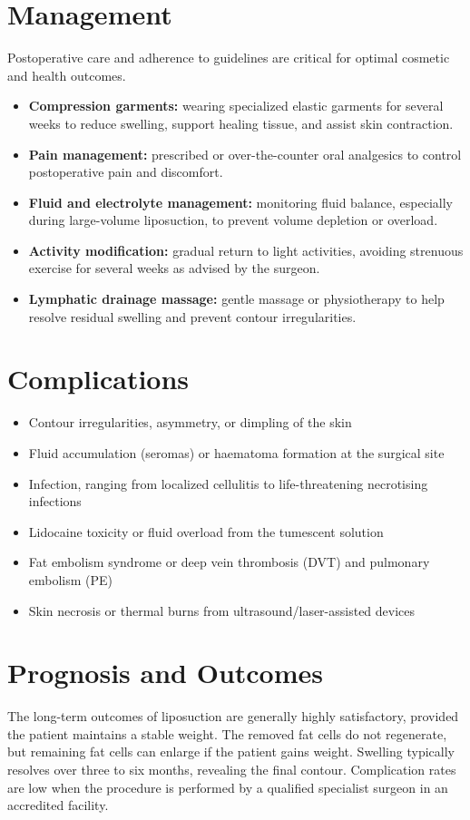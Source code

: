 \section*{Management}
Postoperative care and adherence to guidelines are critical for optimal cosmetic and health outcomes.
\begin{itemize}
    \item \textbf{Compression garments:} wearing specialized elastic garments for several weeks to reduce swelling, support healing tissue, and assist skin contraction.
    \item \textbf{Pain management:} prescribed or over-the-counter oral analgesics to control postoperative pain and discomfort.
    \item \textbf{Fluid and electrolyte management:} monitoring fluid balance, especially during large-volume liposuction, to prevent volume depletion or overload.
    \item \textbf{Activity modification:} gradual return to light activities, avoiding strenuous exercise for several weeks as advised by the surgeon.
    \item \textbf{Lymphatic drainage massage:} gentle massage or physiotherapy to help resolve residual swelling and prevent contour irregularities.
\end{itemize}

\section*{Complications}
\begin{itemize}
    \item Contour irregularities, asymmetry, or dimpling of the skin
    \item Fluid accumulation (seromas) or haematoma formation at the surgical site
    \item Infection, ranging from localized cellulitis to life-threatening necrotising infections
    \item Lidocaine toxicity or fluid overload from the tumescent solution
    \item Fat embolism syndrome or deep vein thrombosis (DVT) and pulmonary embolism (PE)
    \item Skin necrosis or thermal burns from ultrasound/laser-assisted devices
\end{itemize}

\section*{Prognosis and Outcomes}
The long-term outcomes of liposuction are generally highly satisfactory, provided the patient maintains a stable weight. The removed fat cells do not regenerate, but remaining fat cells can enlarge if the patient gains weight. Swelling typically resolves over three to six months, revealing the final contour. Complication rates are low when the procedure is performed by a qualified specialist surgeon in an accredited facility.


